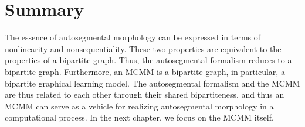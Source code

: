 \section{Summary}\label{sec:graph-concl}
The essence of autosegmental morphology can be expressed in terms of nonlinearity
and nonsequentiality. These two properties are equivalent to the properties of a bipartite graph. Thus, the autosegmental formalism
reduces to a bipartite graph. %
Furthermore, an MCMM is a bipartite graph, in particular, a bipartite graphical learning model. The autosegmental formalism and the MCMM are thus related to
each other through their shared bipartiteness, and thus an MCMM can serve as a vehicle for realizing autosegmental morphology in a computational process. In the next chapter, we focus on the MCMM itself.
